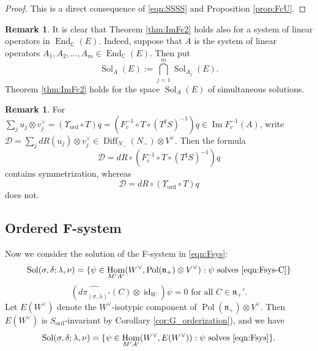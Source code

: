 \documentclass[a4paper,11pt,reqno]{amsart}
\newcommand{\frakn}{\mathfrak{n}}
\newcommand{\calD}{\mathcal{D}}
\newcommand{\0}{{\bf 0}}
\newcommand{\C}{\mathbb{C}}
\newcommand{\1}{{\bf 1}}
\DeclareMathOperator{\End}{End}
\DeclareMathOperator{\Hom}{Hom}
\DeclareMathOperator{\Pol}{Pol}
\DeclareMathOperator{\id}{id}
\renewcommand\Im{\operatorname{Im}}
\newcommand{\ord}{{\mathrm{ord}}}
\DeclareMathOperator{\Diff}{Diff}
\DeclareMathOperator{\Sol}{Sol}
\theoremstyle{plain}
\theoremstyle{definition}
\newtheorem{remark}[equation]{Remark}
\numberwithin{equation}{section}
\theoremstyle{definition}
\begin{document}
\begin{proof}
This is a direct consequence of 
\eqref{eqn:SSSS} and  Proposition \ref{prop:FcU}.
\end{proof}

\begin{remark}\label{rem:ImFc2}
It is clear that Theorem \ref{thm:ImFc2} holds 
also for  a system of linear operators in $\End_\C(E)$. 
Indeed, suppose that $A$ is the system of linear operators
$A_1, A_2, \ldots, A_m \in \End_\C(E)$. Then put 
\begin{equation*}
\Sol_{A}(E):=\bigcap_{j=1}^m\Sol_{A_j}(E).
\end{equation*}
Theorem \ref{thm:ImFc2} holds for the space $\Sol_{A}(E)$ 
of simultaneous solutions.
\end{remark}

\begin{remark}
For $\sum_{j} u_j\otimes v_j^\vee =(\Upsilon_{\ord} \circ T)q = 
 (F_c^{-1}\circ T \circ (T^\sharp S)^{-1})q
\in \Im F_c^{-1}(A)$,  write
$\calD = \sum_{j} dR(u_j)\otimes v_j^\vee
\in \Diff_{N_-}(N_-)\otimes V^\vee$. Then the formula 
\begin{equation*}
\calD =  dR \circ (F_c^{-1}\circ T \circ (T^\sharp S)^{-1})q 
\end{equation*}
contains symmetrization, whereas
\begin{equation*}
\calD=  dR \circ (\Upsilon_{\ord} \circ T)q 
\end{equation*}
does not.
\end{remark}

\subsection{Ordered F-system}
\label{sec:Ordered_Fsystem}

Now we consider the solution of the F-system in \eqref{eqn:Fsys}: 
\begin{equation}\label{eqn:Sol-C}
\mathrm{Sol}(\sigma,\delta;\lambda,\nu)
=\{ \psi \in \Hom_{M'A'}(W^\vee, \Pol(\frakn_+)\otimes V^\vee): 
\text{$\psi$ solves \eqref{eqn:Fsys-C}}\}
\end{equation}
\begin{equation}\label{eqn:Fsys-C}
(\widehat{d\pi_{(\sigma,\lambda)^*}}(C) \otimes \id_W)\psi=0
\,\,
\text{for all $C \in \frakn_+'$}.
\end{equation}
Let $E(W^\vee)$ denote 
the $W^\vee$-isotypic component of $\Pol(\frakn_+)\otimes V^\vee$.
Then $E(W^\vee)$ is $S_\ord$-invariant by Corollary \ref{cor:G_orderization}),
and we have 
\begin{equation*}
\mathrm{Sol}(\sigma,\delta;\lambda,\nu)
=\{ \psi \in \Hom_{M'A'}(W^\vee, E(W^\vee)): 
\text{$\psi$ solves  \eqref{eqn:Fsys}}\}.
\end{equation*}
\end{document}
